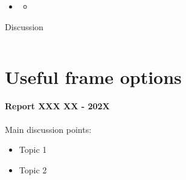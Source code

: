\documentclass[8pt]{beamer}
\begin{document}
	\begin{frame}{}
		\textbf{}\\~\\
		\begin{itemize}
			\item 
			\begin{itemize}
				\item 
			\end{itemize}
		\end{itemize}
	\end{frame}
	\begin{frame}{}
		
	\end{frame}
		\begin{frame}{Discussion}
		\begin{columns}
			
			
			
			
		\end{columns}
	\end{frame}
	

	\section*{Useful frame options}
	\label{}
	\justifying
	\begin{frame}
		\textbf{Report XXX XX - 202X}\\~\\
		Main discussion points:
		\begin{itemize}
			\item Topic 1
			\item Topic 2
		\end{itemize}
	\end{frame}
\end{document}
